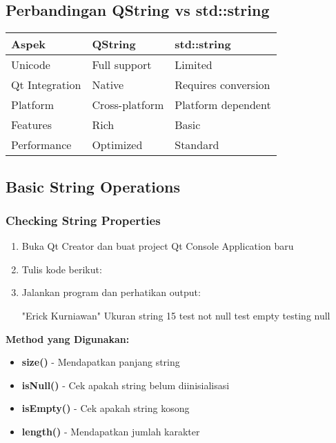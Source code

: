 \subsection{Perbandingan QString vs std::string}

\begin{center}
\begin{tabular}{|l|l|l|}
\hline
\textbf{Aspek} & \textbf{QString} & \textbf{std::string} \\
\hline
Unicode & Full support & Limited \\
\hline
Qt Integration & Native & Requires conversion \\
\hline
Platform & Cross-platform & Platform dependent \\
\hline
Features & Rich & Basic \\
\hline
Performance & Optimized & Standard \\
\hline
\end{tabular}
\end{center}

\subsection{Basic String Operations}

\subsubsection{Checking String Properties}

\begin{enumerate}
\item Buka Qt Creator dan buat project Qt Console Application baru
\item Tulis kode berikut:



\item Jalankan program dan perhatikan output:

\begin{lcverbatim}
"Erick Kurniawan"
Ukuran string  15
test not null
test empty
testing null
\end{lcverbatim}
\end{enumerate}

\textbf{Method yang Digunakan:}
\begin{itemize}
\item \textbf{size()} - Mendapatkan panjang string
\item \textbf{isNull()} - Cek apakah string belum diinisialisasi
\item \textbf{isEmpty()} - Cek apakah string kosong
\item \textbf{length()} - Mendapatkan jumlah karakter
\end{itemize}

